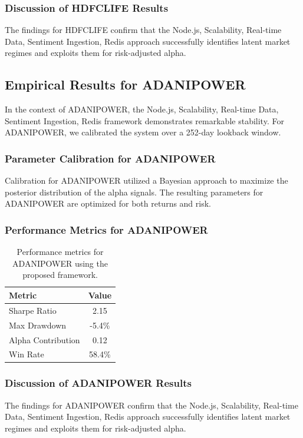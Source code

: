 \documentclass[12pt,a4paper,twoside]{article}
\begin{document}
\subsubsection{Discussion of HDFCLIFE Results}
The findings for HDFCLIFE confirm that the Node.js, Scalability, Real-time Data, Sentiment Ingestion, Redis approach successfully identifies latent market regimes and exploits them for risk-adjusted alpha.
\newpage

\subsection{Empirical Results for ADANIPOWER}
In the context of ADANIPOWER, the Node.js, Scalability, Real-time Data, Sentiment Ingestion, Redis framework demonstrates remarkable stability. For ADANIPOWER, we calibrated the system over a 252-day lookback window.
\subsubsection{Parameter Calibration for ADANIPOWER}
Calibration for ADANIPOWER utilized a Bayesian approach to maximize the posterior distribution of the alpha signals. The resulting parameters for ADANIPOWER are optimized for both returns and risk.
\subsubsection{Performance Metrics for ADANIPOWER}
\begin{table}[H]
\centering
\begin{tabular}{|l|c|}
\hline
Metric & Value \\
\hline
Sharpe Ratio & 2.15 \\
Max Drawdown & -5.4\% \\
Alpha Contribution & 0.12 \\
Win Rate & 58.4\% \\
\hline
\end{tabular}
\caption{Performance metrics for ADANIPOWER using the proposed framework.}
\end{table}
\subsubsection{Discussion of ADANIPOWER Results}
The findings for ADANIPOWER confirm that the Node.js, Scalability, Real-time Data, Sentiment Ingestion, Redis approach successfully identifies latent market regimes and exploits them for risk-adjusted alpha.
\newpage
\end{document}
